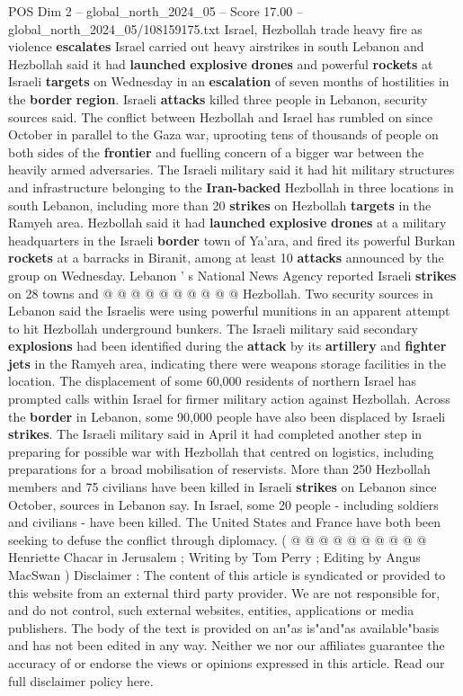 \begin{textsample}{POS Dim 2 – global\_north\_2024\_05 – Score 17.00 – global\_north\_2024\_05/108159175.txt}  \label{ex:f2_pos_385}
Israel, Hezbollah trade heavy fire as violence \textbf{escalates} Israel carried out heavy airstrikes in south Lebanon and Hezbollah said it had \textbf{launched} \textbf{explosive} \textbf{drones} and powerful \textbf{rockets} at Israeli \textbf{targets} on Wednesday in an \textbf{escalation} of seven months of hostilities in the \textbf{border} \textbf{region}.
Israeli \textbf{attacks} killed three people in Lebanon, security sources said.
The conflict between Hezbollah and Israel has rumbled on since October in parallel to the Gaza war, uprooting tens of thousands of people on both sides of the \textbf{frontier} and fuelling concern of a bigger war between the heavily armed adversaries.
The Israeli military said it had hit military structures and infrastructure belonging to the \textbf{Iran-backed} Hezbollah in three locations in south Lebanon, including more than 20 \textbf{strikes} on Hezbollah \textbf{targets} in the Ramyeh area.
Hezbollah said it had \textbf{launched} \textbf{explosive} \textbf{drones} at a military headquarters in the Israeli \textbf{border} town of Ya'ara, and fired its powerful Burkan \textbf{rockets} at a barracks in Biranit, among at least 10 \textbf{attacks} announced by the group on Wednesday.
Lebanon ' s National News Agency reported Israeli \textbf{strikes} on 28 towns and @ @ @ @ @ @ @ @ @ @ Hezbollah.
Two security sources in Lebanon said the Israelis were using powerful munitions in an apparent attempt to hit Hezbollah underground bunkers.
The Israeli military said secondary \textbf{explosions} had been identified during the \textbf{attack} by its \textbf{artillery} and \textbf{fighter} \textbf{jets} in the Ramyeh area, indicating there were weapons storage facilities in the location.
The displacement of some 60,000 residents of northern Israel has prompted calls within Israel for firmer military action against Hezbollah.
Across the \textbf{border} in Lebanon, some 90,000 people have also been displaced by Israeli \textbf{strikes}.
The Israeli military said in April it had completed another step in preparing for possible war with Hezbollah that centred on logistics, including preparations for a broad mobilisation of reservists.
More than 250 Hezbollah members and 75 civilians have been killed in Israeli \textbf{strikes} on Lebanon since October, sources in Lebanon say.
In Israel, some 20 people - including soldiers and civilians - have been killed.
The United States and France have both been seeking to defuse the conflict through diplomacy. ( @ @ @ @ @ @ @ @ @ @ Henriette Chacar in Jerusalem ; Writing by Tom Perry ; Editing by Angus MacSwan ) Disclaimer : The content of this article is syndicated or provided to this website from an external third party provider.
We are not responsible for, and do not control, such external websites, entities, applications or media publishers.
The body of the text is provided on an"as is"and"as available"basis and has not been edited in any way.
Neither we nor our affiliates guarantee the accuracy of or endorse the views or opinions expressed in this article.
Read our full disclaimer policy here.


\end{textsample}
